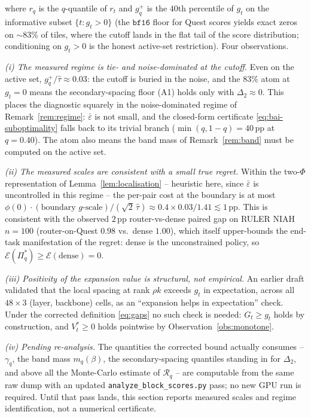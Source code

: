 \documentclass[11pt]{article}
\theoremstyle{remark}
\begin{document}
\noindent where $r_q$ is the $q$-quantile of $r_t$ and $g_q^+$ is the $40$th percentile of $g_t$ on the informative subset $\{t : g_t > 0\}$ (the $\mathtt{bf16}$ floor for Quest scores yields exact zeros on $\sim 83\%$ of tiles, where the cutoff lands in the flat tail of the score distribution; conditioning on $g_t > 0$ is the honest active-set restriction). Four observations.

\emph{(i) The measured regime is tie- and noise-dominated at the cutoff.} Even on the active set, $g_q^+/\hat\tau \approx 0.03$: the cutoff is buried in the noise, and the $83\%$ atom at $g_t = 0$ means the secondary-spacing floor (A1) holds only with $\Delta_2 \approx 0$. This places the diagnostic squarely in the noise-dominated regime of Remark~\ref{rem:regime}: $\bar\varepsilon$ is not small, and the closed-form certificate \eqref{eq:bai-suboptimality} falls back to its trivial branch ($\min(q, 1-q) = 40$\,pp at $q = 0.40$). The atom also means the band mass of Remark~\ref{rem:band} must be computed on the active set.

\emph{(ii) The measured scales are consistent with a small true regret.} Within the two-$\Phi$ representation of Lemma~\ref{lem:localisation} -- heuristic here, since $\bar\varepsilon$ is uncontrolled in this regime -- the per-pair cost at the boundary is at most $\phi(0)\cdot(\text{boundary $g$-scale})/(\sqrt2\,\hat\tau) \approx 0.4 \times 0.03 / 1.41 \lesssim 1$\,pp. This is consistent with the observed $2$\,pp router-vs-dense paired gap on RULER NIAH $n=100$ (router-on-Quest $0.98$ vs.\ dense $1.00$), which itself upper-bounds the end-task manifestation of the regret: dense is the unconstrained policy, so $\mathcal E(\Pi_q^*) \ge \mathcal E(\text{dense}) = 0$.

\emph{(iii) Positivity of the expansion value is structural, not empirical.} An earlier draft validated that the local spacing at rank $\rho k$ exceeds $g_t$ in expectation, across all $48 \times 3$ (layer, backbone) cells, as an ``expansion helps in expectation'' check. Under the corrected definition \eqref{eq:gaps} no such check is needed: $G_t \ge g_t$ holds by construction, and $V^*_t \ge 0$ holds pointwise by Observation~\ref{obs:monotone}.

\emph{(iv) Pending re-analysis.} The quantities the corrected bound actually consumes -- $\gamma_q$, the band mass $m_q(\beta)$, the secondary-spacing quantiles standing in for $\Delta_2$, and above all the Monte-Carlo estimate of $\mathcal R_q$ -- are computable from the same raw dump with an updated \texttt{analyze\_block\_scores.py} pass; no new GPU run is required. Until that pass lands, this section reports measured scales and regime identification, not a numerical certificate.
\end{document}
